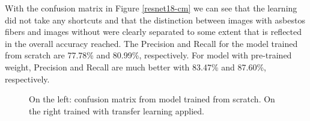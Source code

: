 With the confusion matrix in Figure \ref{resnet18-cm} we can see that the learning did not take any shortcuts and that the distinction between images with asbestos fibers and images without were clearly separated to some extent that is reflected in the overall accuracy reached. The Precision and Recall for the model trained from scratch are 77.78\% and 80.99\%, respectively. For model with pre-trained weight, Precision and Recall are much better with 83.47\% and 87.60\%, respectively.

\begin{figure}[h]
\centering
{}
\caption{On the left: confusion matrix from model trained from scratch. On the right trained with transfer learning applied.}
\label{fig:resnet18-cm}
\end{figure}
















